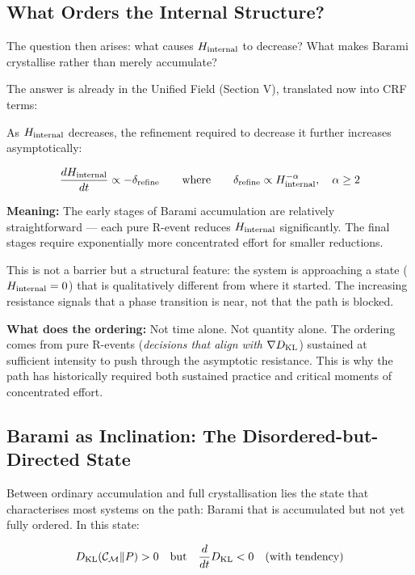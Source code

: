 \documentclass[12pt, a4paper]{article}
\begin{document}
\subsection{What Orders the Internal Structure?}

The question then arises: what causes $H_{\rm internal}$ to decrease? What makes
Barami crystallise rather than merely accumulate?

The answer is already in the Unified Field (Section V), translated now into CRF terms:

\begin{derivedbox}[title={Crystallisation Requires Increasing Refinement Intensity}]
As $H_{\rm internal}$ decreases, the refinement required to decrease it further
increases asymptotically:

\[
  \frac{d H_{\rm internal}}{dt} \propto -\delta_{\rm refine}
  \qquad \text{where} \qquad
  \delta_{\rm refine} \propto H_{\rm internal}^{-\alpha},\quad \alpha \geq 2
\]

\textbf{Meaning:} The early stages of Barami accumulation are relatively
straightforward --- each pure R-event reduces $H_{\rm internal}$ significantly.
The final stages require exponentially more concentrated effort for smaller
reductions.

This is not a barrier but a structural feature: the system is approaching
a state ($H_{\rm internal} = 0$) that is qualitatively different from where
it started. The increasing resistance signals that a phase transition is near,
not that the path is blocked.

\textbf{What does the ordering:}
Not time alone. Not quantity alone.
The ordering comes from pure R-events (\textit{decisions that align with}
$\nabla D_{\rm KL}$) sustained at sufficient intensity to push through the
asymptotic resistance. This is why the path has historically required
both sustained practice and critical moments of concentrated effort.
\end{derivedbox}

\subsection{Barami as Inclination: The Disordered-but-Directed State}

Between ordinary accumulation and full crystallisation lies the state that
characterises most systems on the path: Barami that is accumulated but not yet
fully ordered. In this state:

\[
  D_{\rm KL}(\mathcal{C}_\mathcal{M}\|P) > 0
  \quad \text{but} \quad
  \frac{d}{dt}D_{\rm KL} < 0 \quad \text{(with tendency)}
\]
\end{document}
